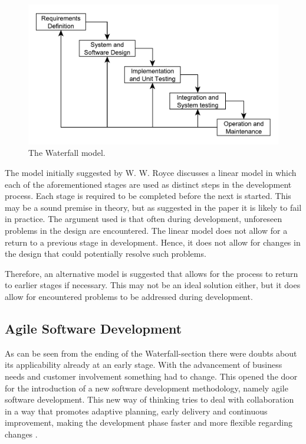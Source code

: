 \begin{figure}
\centering
\includegraphics[width=\textwidth]{images/chapters/development_models/waterfall.pdf}
\caption{The Waterfall model.}
\label{waterfall}
\end{figure}

The model initially suggested by W. W. Royce discusses a linear model in which each of the aforementioned stages are used as distinct steps in the development process. Each stage is required to be completed before the next is started. This may be a sound premise in theory, but as suggested in the paper it is likely to fail in practice. The argument used is that often during development, unforeseen problems in the design are encountered. The linear model does not allow for a return to a previous stage in development. Hence, it does not allow for changes in the design that could potentially resolve such problems.

Therefore, an alternative model is suggested that allows for the process to return to earlier stages if necessary. This may not be an ideal solution either, but it does allow for encountered problems to be addressed during development.

\subsection{Agile Software Development}

As can be seen from the ending of the Waterfall-section there were doubts about its applicability already at an early stage. With the advancement of business needs and customer involvement something had to change. This opened the door for the introduction of a new software development methodology, namely agile software development. This new way of thinking tries to deal with collaboration in a way that promotes adaptive planning, early delivery and continuous improvement, making the development phase faster and more flexible regarding changes \cite{abrahamsson2002}.


